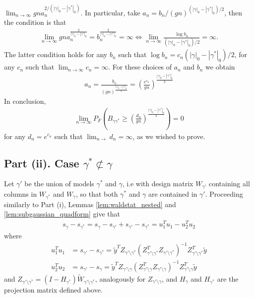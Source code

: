 $\lim_{n \rightarrow \infty} g n a_n^{2/(|\gamma|_0 - |\gamma^*|_0)}$.
In particular, take $a_n= b_n/(gn)^{(|\gamma|_0 - |\gamma^*|_0)/2}$, then the condition is that
\begin{align}
 \lim_{n \rightarrow \infty} g n a_n^{\frac{2}{|\gamma|_0 - |\gamma^*|_0}}=
b_n^{\frac{2}{|\gamma|_0 - |\gamma^*|_0}}= \infty
\Longleftrightarrow 
\lim_{n \rightarrow \infty} \frac{\log b_n}{(|\gamma|_0 - |\gamma^*|_0)/2}= \infty.
\nonumber
\end{align}
The latter condition holds for any $b_n$ such that $\log b_n= c_n (|\gamma|_0 - |\gamma^*|_0)/2$, for any $c_n$ such that $\lim_{n \rightarrow \infty} c_n= \infty$.
For these choices of $a_n$ and $b_n$ we obtain
\begin{align}
 a_n= \frac{b_n}{(gn)^{\frac{|\gamma|_0 - |\gamma^*|_0}{2}}}=
 \left( \frac{e^{c_n}}{gn} \right)^{\frac{|\gamma|_0 - |\gamma^*|_0}{2}}
\nonumber
\end{align}
In conclusion,
\begin{align}
\lim_{n \rightarrow \infty} P_F \left( B_{\gamma \gamma^*} \geq  \left( \frac{d_n}{gn} \right)^{\frac{|\gamma|_0 - |\gamma^*|_0}{2}} \right)= 0
\nonumber
\end{align}
for any $d_n= e^{c_n}$ such that $\lim_{n \rightarrow} d_n= \infty$, as we wished to prove.

\subsection{Part (ii). Case $\gamma^* \not\subset \gamma$}

Let $\gamma'$ be the union of models $\gamma^*$ and $\gamma$, i.e with design matrix $W_{\gamma'}$ containing all columns in $W_{\gamma^*}$ and $W_{\gamma}$, so that both $\gamma^*$ and $\gamma$ are contained in $\gamma'$.
Proceeding similarly to Part (i), Lemmas \ref{lem:waldstat_nested} and \ref{lem:subgaussian_quadform} give that
\begin{align}
 s_\gamma - s_{\gamma^*}=
s_\gamma - s_{\gamma'} + s_{\gamma'} - s_{\gamma^*}=
u_1^T u_1 - u_2^T u_2
\nonumber
\end{align}
where
\begin{align}
u_1^T u_1&=  s_{\gamma'} - s_{\gamma^*}= \tilde{y}^T Z_{\gamma' \setminus \gamma^*} (Z_{\gamma' \setminus \gamma^*}^T Z_{\gamma' \setminus \gamma^*})^{-1} Z_{\gamma' \setminus \gamma^*}^T \tilde{y}
\nonumber \\
u_2^T u_2&= s_{\gamma'} - s_{\gamma}= \tilde{y}^T Z_{\gamma' \setminus \gamma} (Z_{\gamma' \setminus \gamma}^T Z_{\gamma' \setminus \gamma})^{-1} Z_{\gamma' \setminus \gamma}^T \tilde{y}
\nonumber
\end{align}
and $Z_{\gamma' \setminus \gamma^*}= (I - H_{\gamma^*}) \widetilde{W}_{\gamma' \setminus \gamma^*}$, analogously for $Z_{\gamma' \setminus \gamma}$, and $H_{\gamma}$ and $H_{\gamma^*}$ are the projection matrix defined above.


